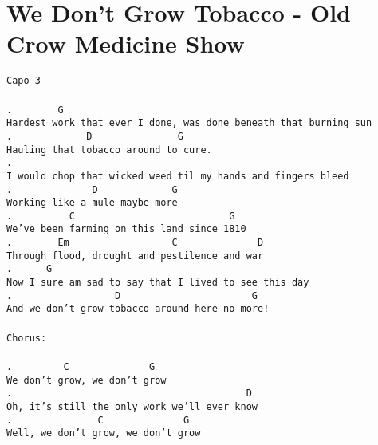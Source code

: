 \newpage
\section{We Don't Grow Tobacco - Old Crow Medicine Show}
\label{We Don't Grow Tobacco - Old Crow Medicine Show}
\texttt{Capo\ 3\\
\\
.\ \ \ \ \ \ \ \ G\\
Hardest\ work\ that\ ever\ I\ done,\ was\ done\ beneath\ that\ burning\ sun\\
.\ \ \ \ \ \ \ \ \ \ \ \ \ D\ \ \ \ \ \ \ \ \ \ \ \ \ \ \ G\\
Hauling\ that\ tobacco\ around\ to\ cure.\\
.\ \ \ \ \ \ \\
I\ would\ chop\ that\ wicked\ weed\ til\ my\ hands\ and\ fingers\ bleed\\
.\ \ \ \ \ \ \ \ \ \ \ \ \ \ D\ \ \ \ \ \ \ \ \ \ \ \ \ G\\
Working\ like\ a\ mule\ maybe\ more\\
.\ \ \ \ \ \ \ \ \ \ C\ \ \ \ \ \ \ \ \ \ \ \ \ \ \ \ \ \ \ \ \ \ \ \ \ \ \ G\\
We've\ been\ farming\ on\ this\ land\ since\ 1810\\
.\ \ \ \ \ \ \ \ Em\ \ \ \ \ \ \ \ \ \ \ \ \ \ \ \ \ \ C\ \ \ \ \ \ \ \ \ \ \ \ \ \ D\\
Through\ flood,\ drought\ and\ pestilence\ and\ war\\
.\ \ \ \ \ \ G\\
Now\ I\ sure\ am\ sad\ to\ say\ that\ I\ lived\ to\ see\ this\ day\\
.\ \ \ \ \ \ \ \ \ \ \ \ \ \ \ \ \ \ D\ \ \ \ \ \ \ \ \ \ \ \ \ \ \ \ \ \ \ \ \ \ \ G\\
And\ we\ don't\ grow\ tobacco\ around\ here\ no\ more!\\
\\
Chorus:\\
\\
.\ \ \ \ \ \ \ \ \ C\ \ \ \ \ \ \ \ \ \ \ \ \ \ G\\
We\ don't\ grow,\ we\ don't\ grow\\
.\ \ \ \ \ \ \ \ \ \ \ \ \ \ \ \ \ \ \ \ \ \ \ \ \ \ \ \ \ \ \ \ \ \ \ \ \ \ \ \ \ D\\
Oh,\ it's\ still\ the\ only\ work\ we'll\ ever\ know\\
.\ \ \ \ \ \ \ \ \ \ \ \ \ \ \ C\ \ \ \ \ \ \ \ \ \ \ \ \ \ G\\
Well,\ we\ don't\ grow,\ we\ don't\ grow\\
}
